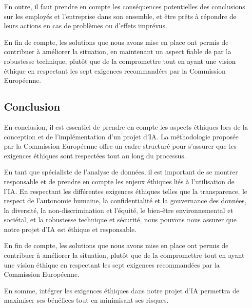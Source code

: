 En outre, il faut prendre en compte les conséquences potentielles des conclusions sur les employés et l'entreprise dans son ensemble, et être prêts à répondre de leurs actions en cas de problèmes ou d'effets imprévus.  

En fin de compte, les solutions que nous avons mise en place ont permis de contribuer à améliorer la situation, en maintenant un aspect fiable de par la robustesse technique, plutôt que de la compromettre tout en ayant une vision éthique en respectant les sept exigences recommandées par la Commission Européenne.







\newpage
\subsection{Conclusion}
En conclusion, il est essentiel de prendre en compte les aspects éthiques lors de la conception et de l'implémentation d'un projet d'IA. La méthodologie proposée par la Commission Européenne offre un cadre structuré pour s'assurer que les exigences éthiques sont respectées tout au long du processus.  

En tant que spécialiste de l'analyse de données, il est important de se montrer responsable et de prendre en compte les enjeux éthiques liés à l'utilisation de l'IA. En respectant les différentes exigences éthiques telles que la transparence, le respect de l'autonomie humaine, la confidentialité et la gouvernance des données, la diversité, la non-discrimination et l'équité, le bien-être environnemental et sociétal, et la robustesse technique et sécurité, nous pouvons nous assurer que notre projet d'IA est éthique et responsable. 

En fin de compte, les solutions que nous avons mise en place ont permis de contribuer à améliorer la situation, plutôt que de la compromettre tout en ayant une vision éthique en respectant les sept exigences recommandées par la Commission Européenne. 

En somme, intégrer les exigences éthiques dans notre projet d'IA permettra de maximiser ses bénéfices tout en minimisant ses risques. 